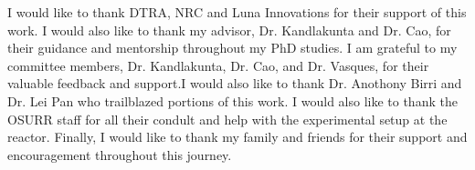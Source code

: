 \begin{acknowledgements}
I would like to thank DTRA, NRC and Luna Innovations for their support of this work.  I would also like to thank my advisor, Dr. Kandlakunta and Dr. Cao, for their guidance and mentorship throughout my PhD studies.  I am grateful to my committee members, Dr. Kandlakunta, Dr. Cao, and Dr. Vasques, for their valuable feedback and support.I would also like to thank Dr. Anothony Birri and Dr. Lei Pan who trailblazed portions of this work. I would also like to thank the OSURR staff for all their condult and help with the experimental setup at the reactor. 
Finally, I would like to thank my family and friends for their support and encouragement throughout this journey.
\end{acknowledgements}

